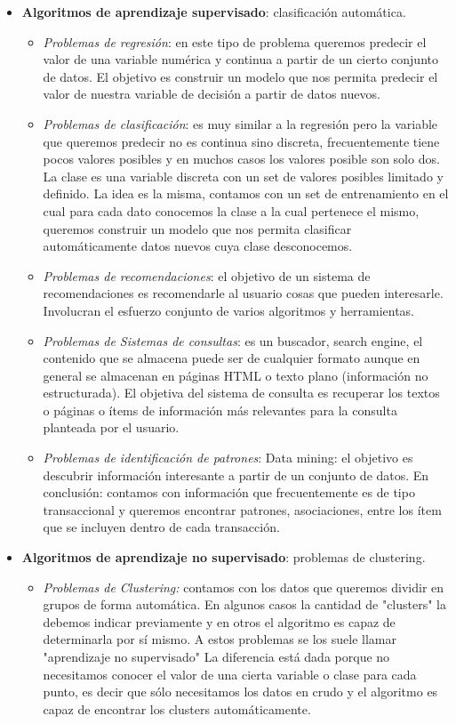 \documentclass[titlepage,a4paper]{article}
\begin{document}
\begin{itemize}
\item\textbf{ Algoritmos de aprendizaje supervisado}: clasificación automática.
\begin{itemize}
\item \textit{Problemas de regresión}: en este tipo de problema queremos predecir el valor de una variable numérica y continua a partir de un cierto conjunto de datos. El objetivo es construir un modelo que nos permita predecir el valor de nuestra variable de decisión a partir de datos nuevos. 
\item\textit{ Problemas de clasificación}: es muy similar a la regresión pero la variable que queremos predecir no es continua sino discreta, frecuentemente tiene pocos valores posibles y en muchos casos los valores posible son solo dos. La clase es una variable discreta con un set de valores posibles limitado y definido.  La idea es la misma, contamos con un set de entrenamiento en el cual para cada dato conocemos la clase a la cual pertenece el mismo, queremos construir un modelo que nos permita clasificar automáticamente datos nuevos cuya clase desconocemos. 
\item  \textit{Problemas de recomendaciones}: el objetivo de un sistema de recomendaciones es recomendarle al usuario cosas que pueden interesarle. Involucran el esfuerzo conjunto de varios algoritmos y herramientas. 
\item \textit{Problemas de Sistemas de consultas}: es un buscador, search engine, el contenido que se almacena puede ser de cualquier formato aunque en general se almacenan en páginas HTML o texto plano (información no estructurada). El objetiva del sistema de consulta es recuperar los textos o páginas o ítems de información más relevantes para la consulta planteada por el usuario. 
\item \textit{Problemas de identificación de patrones}: Data mining: el objetivo es descubrir información interesante a partir de un conjunto de datos. En conclusión: contamos con información que frecuentemente es de tipo transaccional y queremos encontrar patrones, asociaciones, entre los ítem que se incluyen dentro de cada transacción. 
\end{itemize}
\item \textbf{Algoritmos de aprendizaje no supervisado}: problemas de clustering. 
\begin{itemize}
\item \textit{Problemas de Clustering:} contamos con los datos que queremos dividir en grupos de forma automática.  En algunos casos la cantidad de "clusters" la debemos indicar previamente y en otros el algoritmo es capaz de determinarla por sí mismo. A estos problemas se los suele llamar "aprendizaje no supervisado" La diferencia está dada porque no necesitamos conocer el valor de una cierta variable o clase para cada punto, es decir que sólo necesitamos los datos en crudo y el algoritmo es capaz de encontrar los clusters automáticamente. 
\end{itemize}
\end{itemize}
\end{document}
